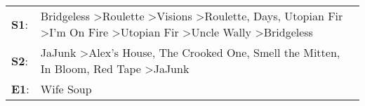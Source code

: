 \begin{supertabular}{p{0.03\textwidth}p{0.92\textwidth}}
 \textbf{S1}:  &  Bridgeless\textsuperscript{} \textgreater \enspace Roulette\textsuperscript{} \textgreater \enspace Visions\textsuperscript{} \textgreater \enspace Roulette\textsuperscript{},  Days\textsuperscript{}, \enspace Utopian Fir\textsuperscript{} \textgreater \enspace I'm On Fire\textsuperscript{} \textgreater \enspace Utopian Fir\textsuperscript{} \textgreater \enspace Uncle Wally\textsuperscript{} \textgreater \enspace Bridgeless\textsuperscript{}  \enspace  \\
 \textbf{S2}:  &                                                                                                                                                                            JaJunk\textsuperscript{} \textgreater \enspace Alex's House\textsuperscript{}, \enspace The Crooked One\textsuperscript{}, \enspace Smell the Mitten\textsuperscript{}, \enspace In Bloom\textsuperscript{}, \enspace Red Tape\textsuperscript{} \textgreater \enspace JaJunk\textsuperscript{}  \enspace  \\
 \textbf{E1}:  &                                                                                                                                                                                                                                                                                                                                                                                                                                                Wife Soup\textsuperscript{}  \enspace  \\
\end{supertabular}
